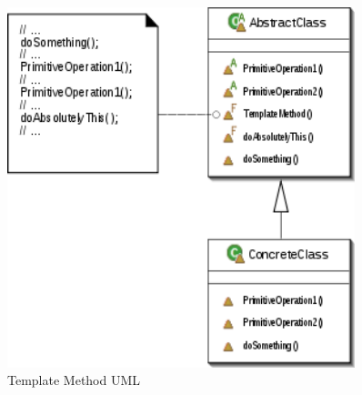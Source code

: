 \begin{figure}[H]
	\centering
	\includegraphics[width=0.9\textwidth]{content/gof/images/18-template-method-uml.png}
	\caption{Template Method UML}
\end{figure}


